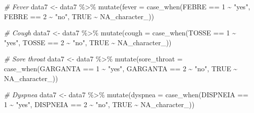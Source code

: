 \documentclass[
]{article}
\newenvironment{Shaded}{\begin{snugshade}}{\end{snugshade}}
\newcommand{\AttributeTok}[1]{\textcolor[rgb]{0.77,0.63,0.00}{#1}}
\newcommand{\CommentTok}[1]{\textcolor[rgb]{0.56,0.35,0.01}{\textit{#1}}}
\newcommand{\ConstantTok}[1]{\textcolor[rgb]{0.00,0.00,0.00}{#1}}
\newcommand{\DecValTok}[1]{\textcolor[rgb]{0.00,0.00,0.81}{#1}}
\newcommand{\FunctionTok}[1]{\textcolor[rgb]{0.00,0.00,0.00}{#1}}
\newcommand{\NormalTok}[1]{#1}
\newcommand{\OtherTok}[1]{\textcolor[rgb]{0.56,0.35,0.01}{#1}}
\newcommand{\SpecialCharTok}[1]{\textcolor[rgb]{0.00,0.00,0.00}{#1}}
\newcommand{\StringTok}[1]{\textcolor[rgb]{0.31,0.60,0.02}{#1}}
\begin{document}
\begin{Shaded}
\begin{Highlighting}[]
\CommentTok{\# Fever}
\NormalTok{data7 }\OtherTok{\textless{}{-}}\NormalTok{  data7 }\SpecialCharTok{\%\textgreater{}\%}
  \FunctionTok{mutate}\NormalTok{(}\AttributeTok{fever =} \FunctionTok{case\_when}\NormalTok{(FEBRE }\SpecialCharTok{==} \DecValTok{1} \SpecialCharTok{\textasciitilde{}} \StringTok{"yes"}\NormalTok{,}
\NormalTok{                           FEBRE }\SpecialCharTok{==} \DecValTok{2} \SpecialCharTok{\textasciitilde{}} \StringTok{"no"}\NormalTok{,}
                           \ConstantTok{TRUE} \SpecialCharTok{\textasciitilde{}} \ConstantTok{NA\_character\_}\NormalTok{))}

\CommentTok{\# Cough}
\NormalTok{data7 }\OtherTok{\textless{}{-}}\NormalTok{  data7 }\SpecialCharTok{\%\textgreater{}\%}
  \FunctionTok{mutate}\NormalTok{(}\AttributeTok{cough =} \FunctionTok{case\_when}\NormalTok{(TOSSE }\SpecialCharTok{==} \DecValTok{1} \SpecialCharTok{\textasciitilde{}} \StringTok{"yes"}\NormalTok{,}
\NormalTok{                           TOSSE }\SpecialCharTok{==} \DecValTok{2} \SpecialCharTok{\textasciitilde{}} \StringTok{"no"}\NormalTok{,}
                           \ConstantTok{TRUE} \SpecialCharTok{\textasciitilde{}} \ConstantTok{NA\_character\_}\NormalTok{))}

\CommentTok{\# Sore throat}
\NormalTok{data7 }\OtherTok{\textless{}{-}}\NormalTok{  data7 }\SpecialCharTok{\%\textgreater{}\%}
  \FunctionTok{mutate}\NormalTok{(}\AttributeTok{sore\_throat =} \FunctionTok{case\_when}\NormalTok{(GARGANTA }\SpecialCharTok{==} \DecValTok{1} \SpecialCharTok{\textasciitilde{}} \StringTok{"yes"}\NormalTok{,}
\NormalTok{                                 GARGANTA }\SpecialCharTok{==} \DecValTok{2} \SpecialCharTok{\textasciitilde{}} \StringTok{"no"}\NormalTok{,}
                                 \ConstantTok{TRUE} \SpecialCharTok{\textasciitilde{}} \ConstantTok{NA\_character\_}\NormalTok{))}

\CommentTok{\# Dyspnea}
\NormalTok{data7 }\OtherTok{\textless{}{-}}\NormalTok{  data7 }\SpecialCharTok{\%\textgreater{}\%}
  \FunctionTok{mutate}\NormalTok{(}\AttributeTok{dyspnea =} \FunctionTok{case\_when}\NormalTok{(DISPNEIA }\SpecialCharTok{==} \DecValTok{1} \SpecialCharTok{\textasciitilde{}} \StringTok{"yes"}\NormalTok{,}
\NormalTok{                             DISPNEIA }\SpecialCharTok{==} \DecValTok{2} \SpecialCharTok{\textasciitilde{}} \StringTok{"no"}\NormalTok{,}
                             \ConstantTok{TRUE} \SpecialCharTok{\textasciitilde{}} \ConstantTok{NA\_character\_}\NormalTok{))}


\end{Highlighting}
\end{Shaded}
\end{document}
